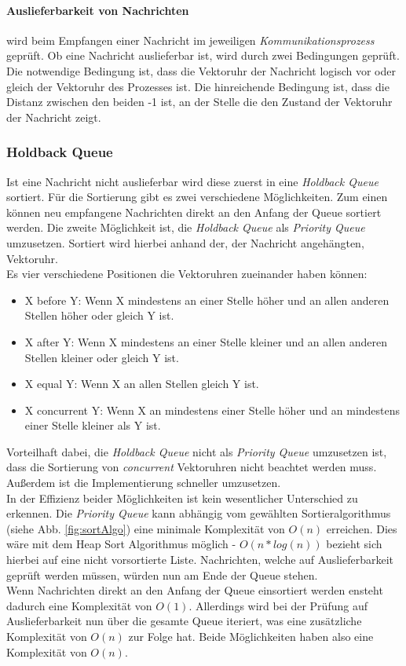 \paragraph{Auslieferbarkeit von Nachrichten} wird beim Empfangen einer Nachricht im jeweiligen \textit{Kommunikationsprozess} geprüft. Ob eine Nachricht auslieferbar ist, wird durch zwei Bedingungen geprüft. Die notwendige Bedingung ist, dass die Vektoruhr der Nachricht logisch vor oder gleich der Vektoruhr des Prozesses ist. Die hinreichende Bedingung ist, dass die Distanz zwischen den beiden -1 ist, an der Stelle die den Zustand der Vektoruhr der Nachricht zeigt.

\subsubsection{Holdback Queue} \label{hbq_theory}

Ist eine Nachricht nicht auslieferbar wird diese zuerst in eine \textit{Holdback Queue} sortiert. Für die Sortierung gibt es zwei verschiedene Möglichkeiten. Zum einen können neu empfangene Nachrichten direkt an den Anfang der Queue sortiert werden. Die zweite Möglichkeit ist, die \textit{Holdback Queue} als \textit{Priority Queue} umzusetzen. Sortiert wird hierbei anhand der, der Nachricht angehängten, Vektoruhr.\\
Es vier verschiedene Positionen die Vektoruhren zueinander haben können:
\begin{itemize} \label{positionVTs}
  \item X before Y: Wenn X mindestens an einer Stelle höher und an allen anderen Stellen höher oder gleich Y ist.
  \item X after Y: Wenn X mindestens an einer Stelle kleiner und an allen anderen Stellen kleiner oder gleich Y ist.
  \item X equal Y: Wenn X an allen Stellen gleich Y ist.
  \item X concurrent Y: Wenn X an mindestens einer Stelle höher und an mindestens einer Stelle kleiner als Y ist.
\end{itemize}

Vorteilhaft dabei, die \textit{Holdback Queue} nicht als \textit{Priority Queue} umzusetzen ist, dass die Sortierung von \textit{concurrent} Vektoruhren nicht beachtet werden muss. Außerdem ist die Implementierung schneller umzusetzen.\\
In der Effizienz beider Möglichkeiten ist kein wesentlicher Unterschied zu erkennen. Die \textit{Priority Queue} kann abhängig vom gewählten Sortieralgorithmus (siehe Abb. \ref{fig:sortAlgo}) eine minimale Komplexität von $O(n)$ erreichen. Dies wäre mit dem Heap Sort Algorithmus möglich - $O(n*log(n))$ bezieht sich hierbei auf eine nicht vorsortierte Liste. Nachrichten, welche auf Auslieferbarkeit geprüft werden müssen, würden nun am Ende der Queue stehen.\\
Wenn Nachrichten direkt an den Anfang der Queue einsortiert werden ensteht dadurch eine Komplexität von $O(1)$. Allerdings wird bei der Prüfung auf Auslieferbarkeit nun über die gesamte Queue iteriert, was eine zusätzliche Komplexität von $O(n)$ zur Folge hat. Beide Möglichkeiten haben also eine Komplexität von $O(n)$.

